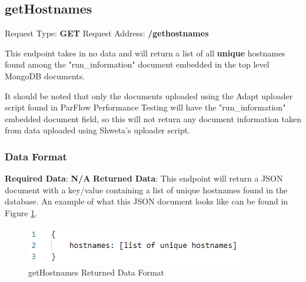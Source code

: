 \subsection{getHostnames}
Request Type: \textbf{GET}
\newline
Request Address: \textbf{/gethostnames}
\newline

This endpoint takes in no data and will return a list of all \textbf{unique} hostnames found among the "run\_information" document embedded in the top level MongoDB documents.

It should be noted that only the documents uploaded using the Adapt uploader script found in ParFlow Performance Testing will have the "run\_information" embedded document field, so this will not return any document information taken from data uploaded using Shweta's uploader script.

\subsubsection{Data Format}
\textbf{Required Data}: \textbf{N/A}
\newline
\newline
\textbf{Returned Data}:
\newline
\newline
This endpoint will return a JSON document with a key/value containing a list of unique hostnames found in the database. An example of what this JSON document looks like can be found in Figure \ref{fig:getHostnames}.

\begin{figure}[H]
    \centering
    \includegraphics{img/gethostnames.PNG}
    \caption{getHostnames Returned Data Format}
    \label{fig:getHostnames}
\end{figure}
